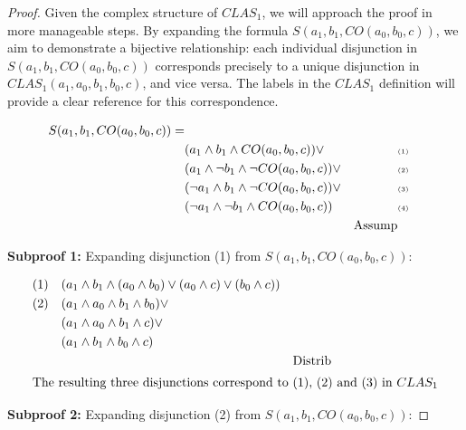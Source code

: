 \documentclass{article}
\begin{document}
\begin{proof}
	
	Given the complex structure of $CLAS_1$, we will approach the proof in more manageable steps. By expanding the formula $ S(a_1, b_1, CO(a_0, b_0, c)) $, we aim to demonstrate a bijective relationship: each individual disjunction in  $ S(a_1, b_1, CO(a_0, b_0, c)) $ corresponds precisely to a unique disjunction in $ CLAS_1(a_1, a_0, b_1, b_0, c) $, and vice versa. The labels in the $ CLAS_1 $ definition will provide a clear reference for this correspondence.
	
	\begin{align*}
		S(a_1, b_1, CO(a_0, b_0, c)) = \\ 
		& (a_1 \land b_1 \land CO(a_0, b_0, c)) \lor && \text{\tiny (1)} \\ 
		& (a_1 \land \lnot b_1 \land \lnot CO(a_0, b_0, c)) \lor && \text{\tiny (2)} \\ 
		& (\lnot a_1 \land b_1 \land \lnot CO(a_0, b_0, c)) \lor && \text{\tiny (3)} \\
		& (\lnot a_1 \land \lnot b_1 \land CO(a_0, b_0, c))  && \text{\tiny (4)} \\ 
		&& \text{Assump}
	\end{align*}
	
	\textbf{Subproof 1:}  Expanding disjunction (1)  from $S(a_1, b_1, CO(a_0, b_0, c))$:
	
	\begin{align*}
		(1)  & \quad (a_1 \land b_1 \land (a_0 \land b_0) \lor (a_0 \land c) \lor (b_0 \land c) ) \\
		(2)  & \quad  (a_1 \land a_0 \land b_1   \land b_0) \lor \\
			   & \quad (a_1 \land a_0 \land b_1   \land c) \lor \\
			   & \quad (a_1 \land b_1  \land b_0 \land c)  \\
			   && \text{Distrib} \\	
			   \intertext{The resulting three  disjunctions correspond to (1), (2) and (3) in $CLAS_1$}
	\end{align*}
	
	\textbf{Subproof 2:}  Expanding disjunction (2)  from $S(a_1, b_1, CO(a_0, b_0, c))$:


\end{proof}
\end{document}
